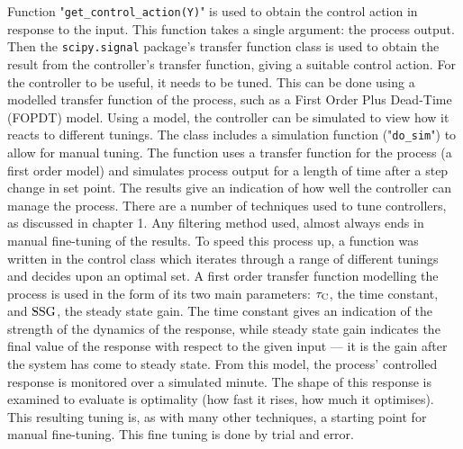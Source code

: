 \documentclass[twoside,a4]{report}
\def\br{\newline \newline \noindent}
\begin{document}
	Function "\texttt{get\_control\_action(Y)}" is used to obtain the control action in response to the input. This function takes a single argument: the process output. Then the \texttt{scipy.signal} package's transfer function class is used to obtain the result from the controller's transfer function, giving a suitable control action.
	\br
	For the controller to be useful, it needs to be tuned. This can be done using a modelled transfer function of the process, such as a First Order Plus Dead-Time (FOPDT) model. Using a model, the controller can be simulated to view how it reacts to different tunings. The class includes a simulation function ("\texttt{do\_sim}") to allow for manual tuning. The function uses a transfer function for the process (a first order model) and simulates process output for a length of time after a step change in set point. The results give an indication of how well the controller can manage the process. 
	\br
	There are a number of techniques used to tune controllers, as discussed in chapter 1. Any filtering method used, almost always ends in manual fine-tuning of the results. To speed this process up, a function was written in the control class which iterates through a range of different tunings and decides upon an optimal set. A first order transfer function modelling the process is used in the form of its two main parameters: $\rm\tau_C$, the time constant, and $\rm SSG$, the steady state gain. The time constant gives an indication of the strength of the dynamics of the response, while steady state gain indicates the final value of the response with respect to the given input --- it is the gain after the system has come to steady state. From this model, the process' controlled response is monitored over a simulated minute. The shape of this response is examined to evaluate is optimality (how fast it rises, how much it optimises). This resulting tuning is, as with many other techniques, a starting point for manual fine-tuning. This fine tuning is done by trial and error.
	
	
\end{document}
